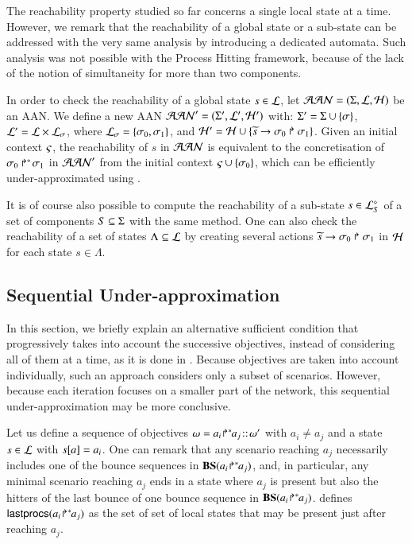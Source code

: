 The reachability property studied so far concerns a single local state at a time.
However, we remark that the reachability of a global state or a sub-state can be
addressed with the very same analysis by introducing a dedicated automata.
Such analysis was not possible with the Process Hitting framework,
because of the lack of the notion of simultaneity for more than two components.

In order to check the reachability of a global state $s \in \PHl$,
let $\PH = (\PHs, \PHl, \PHh)$ be an AAN.
We define a new AAN $\PH' = (\PHs', \PHl', \PHh')$ with:
$\PHs' = \PHs \cup \{ \reach \}$, $\PHl' = \PHl \times \PHl_\reach$,
where $\PHl_\reach = \{ \reach_0, \reach_1 \}$,
and $\PHh' = \PHh \cup \{ \PHhit{\toset{s}}{\reach_0}{\reach_1} \}$.
Given an initial context $\ctx$, the reachability of $s$ in $\PH$
is equivalent to the concretisation of $\PHobjp{\reach}{0}{1}$ in $\PH'$
from the initial context $\ctx \cup \{ \reach_0 \}$,
which can be efficiently under-approximated using .

It is of course also possible to compute the reachability
of a sub-state $s \in \PHsubl[\PHl]_S$ of a set of components $S \subseteq \PHs$
with the same method.
One can also check the reachability of a set of states $\Lambda \subseteq \PHl$
by creating several actions
$\PHhit{\toset{s}}{\reach_0}{\reach_1}$ in $\PHh$ for each state $s \in \Lambda$.



\subsection{Sequential Under-approximation}
\label{ssec:ordered-ua}

In this section, we briefly explain an alternative sufficient condition that
progressively takes into account the successive objectives, instead of
considering all of them at a time, as it is done in .
Because objectives are taken into account individually, such an approach
considers only a subset of scenarios.
However, because each iteration focuses on a smaller part of the network, this
sequential under-approximation may be more conclusive.

Let us define a sequence of objectives $\w=\obj{a_i}{a_j}\concat\w'$ with
$a_i\neq a_j$ and a state $s\in \PHl$ with $\get{s}{a}=a_i$.
One can remark that any scenario reaching $a_j$ necessarily includes one of the
bounce sequences in $\BS(\obj{a_i}{a_j})$, and, in particular,
any minimal scenario reaching $a_j$ ends in a state where $a_j$ is present but
also the hitters of the last bounce of one bounce sequence in $\BS(\obj{a_i}{a_j})$.
 defines $\lastprocs(\obj{a_i}{a_j})$ as the set of set of
local states that may be present just after reaching $a_j$.

